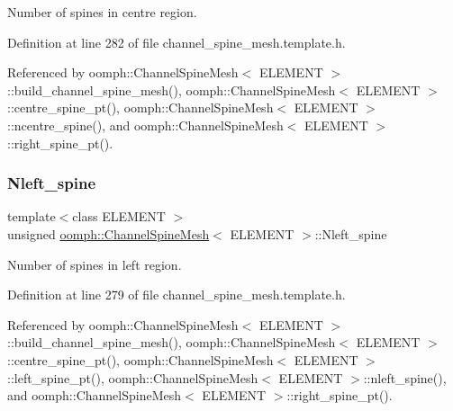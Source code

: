 Number of spines in centre region. 



Definition at line 282 of file channel\+\_\+spine\+\_\+mesh.\+template.\+h.



Referenced by oomph\+::\+Channel\+Spine\+Mesh$<$ E\+L\+E\+M\+E\+N\+T $>$\+::build\+\_\+channel\+\_\+spine\+\_\+mesh(), oomph\+::\+Channel\+Spine\+Mesh$<$ E\+L\+E\+M\+E\+N\+T $>$\+::centre\+\_\+spine\+\_\+pt(), oomph\+::\+Channel\+Spine\+Mesh$<$ E\+L\+E\+M\+E\+N\+T $>$\+::ncentre\+\_\+spine(), and oomph\+::\+Channel\+Spine\+Mesh$<$ E\+L\+E\+M\+E\+N\+T $>$\+::right\+\_\+spine\+\_\+pt().

\mbox{\label{classoomph_1_1ChannelSpineMesh_a56fbad56271c5e37cd7f1d2de7b7bb36}} 
\subsubsection{\texorpdfstring{Nleft\+\_\+spine}{Nleft\_spine}}
{\footnotesize\ttfamily template$<$class E\+L\+E\+M\+E\+NT $>$ \\
unsigned \hyperlink{classoomph_1_1ChannelSpineMesh}{oomph\+::\+Channel\+Spine\+Mesh}$<$ E\+L\+E\+M\+E\+NT $>$\+::Nleft\+\_\+spine\hspace{0.3cm}{\ttfamily [protected]}}



Number of spines in left region. 



Definition at line 279 of file channel\+\_\+spine\+\_\+mesh.\+template.\+h.



Referenced by oomph\+::\+Channel\+Spine\+Mesh$<$ E\+L\+E\+M\+E\+N\+T $>$\+::build\+\_\+channel\+\_\+spine\+\_\+mesh(), oomph\+::\+Channel\+Spine\+Mesh$<$ E\+L\+E\+M\+E\+N\+T $>$\+::centre\+\_\+spine\+\_\+pt(), oomph\+::\+Channel\+Spine\+Mesh$<$ E\+L\+E\+M\+E\+N\+T $>$\+::left\+\_\+spine\+\_\+pt(), oomph\+::\+Channel\+Spine\+Mesh$<$ E\+L\+E\+M\+E\+N\+T $>$\+::nleft\+\_\+spine(), and oomph\+::\+Channel\+Spine\+Mesh$<$ E\+L\+E\+M\+E\+N\+T $>$\+::right\+\_\+spine\+\_\+pt().

\mbox{\label{classoomph_1_1ChannelSpineMesh_a56f7259d8e5dee66a8c83ffe99526c62}} 
